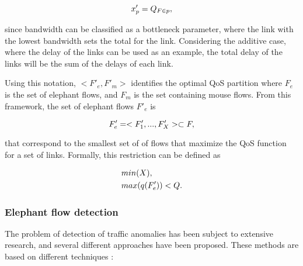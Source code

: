 \begin{equation*}
    \centering
    x'_p = Q_{F \in p},
\end{equation*}

since bandwidth can be classified as a bottleneck parameter, where the link with the lowest bandwidth sets the total for the link. Considering the additive case, 
where the delay of the links can be used as an example, the total delay of the links will be the sum of the delays of each link.

\par Using this notation, $<F'_e, F'_m>$ identifies the optimal QoS partition where $F_e$ is the set of elephant flows, and $F_m$ is the set containing 
mouse flows. From this framework, the set of elephant flows $F'_e$ is

\begin{equation*}
    \centering
    F'_e = <F'_1, ..., F'_X> \subset F,
\end{equation*}

\par that correspond to the smallest set of of flows that maximize the QoS function for a set of links. Formally, this restriction can be defined as

\begin{equation*}
    \centering
        \begin{split}
        &min(X), \\ 
        &max(q(F'_e)) < Q.
        \end{split}
\end{equation*}

\subsubsection{Elephant flow detection}

The problem of detection of traffic anomalies has been subject to extensive research, and several different approaches have been proposed. These methods are
based on different techniques \cite{curtis_mahout:_2011}:

